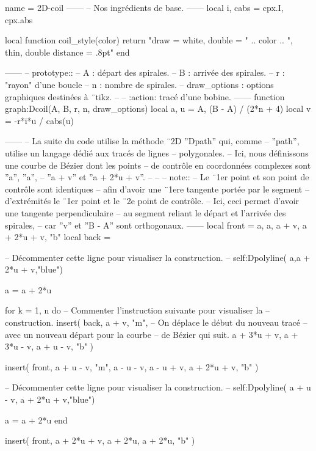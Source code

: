 \documentclass[varwidth]{standalone}
\begin{document}
\begin{luadraw*}{name = 2D-coil}
------
-- Nos ingrédients de base.
------
local i, cabs = cpx.I, cpx.abs

local function coil_style(color)
  return "draw = white, double = " .. color
      .. ", thin, double distance = .8pt"
end

------
-- prototype::
--     A            : départ des spirales.
--     B            : arrivée des spirales.
--     r            : "rayon" d'une boucle
--     n            : nombre de spirales.
--     draw_options : options graphiques destinées à ¨tikz.
--
--     :action: tracé d'une bobine.
------
function graph:Dcoil(A, B, r, n, draw_options)
  local a, u = A, (B - A) / (2*n + 4)
  local v    = -r*i*u / cabs(u)

------
-- La suite du code utilise la méthode ¨2D ''Dpath'' qui, comme
-- ''path'', utilise un langage dédié aux tracés de lignes
-- polygonales.
-- Ici, nous définissons une courbe de Bézier dont les points
-- de contrôle en coordonnées complexes sont ''a'', ''a'',
-- ''a + v'' et ''a + 2*u + v''.
--
--
-- note::
--     Le ¨1er point et son point de contrôle sont identiques
--     afin d'avoir une ¨1ere tangente portée par le segment
--     d'extrémités le ¨1er point et le ¨2e point de contrôle.
--     Ici, ceci permet d'avoir une tangente perpendiculaire
--     au segment reliant le départ et l'arrivée des spirales,
--     car ''v'' et ''B - A'' sont orthogonaux.
------
  local front = {a, a, a + v, a + 2*u + v, "b"}
  local back  = {}

-- Décommenter cette ligne pour visualiser la construction.
--  self:Dpolyline( {a,a + 2*u + v},"blue")

  a = a + 2*u

  for k = 1, n do
-- Commenter l'instruction suivante pour visualiser la
-- construction.
    insert(
      back,
      {
        a + v, "m", -- On déplace le début du nouveau tracé
                    -- avec un nouveau départ pour la courbe
                    -- de Bézier qui suit.
        a + 3*u + v, a + 3*u - v, a + u - v, "b"
      }
    )

    insert(
      front,
      {
        a + u - v, "m",
        a - u - v, a - u + v, a + 2*u + v, "b"
      }
    )

-- Décommenter cette ligne pour visualiser la construction.
--    self:Dpolyline( {a + u - v, a + 2*u + v},"blue")

    a = a + 2*u
  end

  insert(
    front,
    {a + 2*u + v, a + 2*u, a + 2*u, "b"}
  )


\end{luadraw*}
\end{document}
